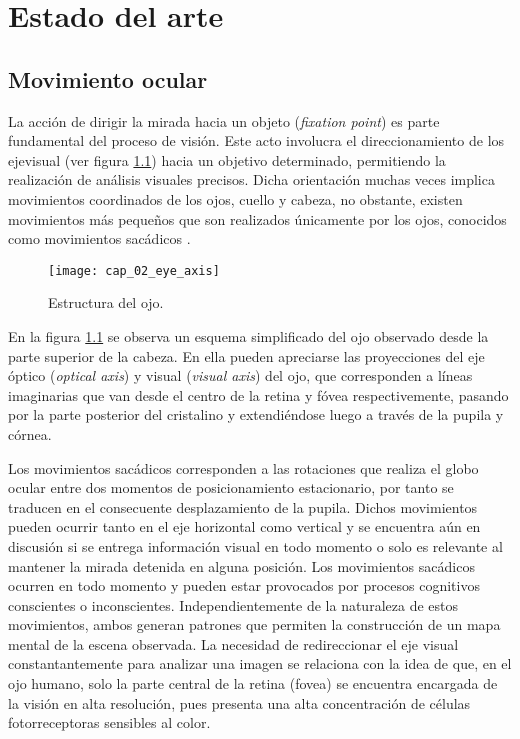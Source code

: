 \documentclass[../main.tex]{subfiles}
\begin{document}
		
\chapter{Estado del arte}
\label{cha:02_estado_del_arte}
	\section{Movimiento ocular}
	\label{sec:02_movimiento_ocular}
		La acción de dirigir la mirada hacia un objeto (\textit{fixation point}) es parte fundamental del proceso de visión. Este acto involucra el direccionamiento de los \gls{ejevisual} (ver figura \ref{fig:02_eye_axis}) hacia un objetivo determinado, permitiendo la realización de análisis visuales precisos. Dicha orientación muchas veces implica movimientos coordinados de los ojos, cuello y cabeza, no obstante, existen movimientos más pequeños que son realizados únicamente por los ojos, conocidos como movimientos sacádicos \cite{article:movOcular1, article:movOcular2}.
		\begin{figure}[H]
			\centering
			\texttt{[image: cap\_02\_eye\_axis]}
			\caption[Estructura del ojo]{Estructura del ojo\footnotemark.}
			\label{fig:02_eye_axis}
		\end{figure}

		En la figura \ref{fig:02_eye_axis} se observa un esquema simplificado del ojo observado desde la parte superior de la cabeza. En ella pueden apreciarse las proyecciones del eje óptico (\textit{optical axis}) y visual (\textit{visual axis}) del ojo, que corresponden a líneas imaginarias que van desde el centro de la retina y fóvea respectivemente, pasando por la parte posterior del cristalino y extendiéndose luego a través de la pupila y córnea.  

		Los movimientos sacádicos corresponden a las rotaciones que realiza el globo ocular entre dos momentos de posicionamiento estacionario, por tanto se traducen en el consecuente desplazamiento de la pupila. Dichos movimientos pueden ocurrir tanto en el eje horizontal como vertical y se encuentra aún en discusión \cite{article:movOcular2, article:movOcular3} si se entrega información visual en todo momento o solo es relevante al mantener la mirada detenida en alguna posición. Los movimientos sacádicos ocurren en todo momento y pueden estar provocados por procesos cognitivos conscientes o inconscientes. Independientemente de la naturaleza de estos movimientos, ambos generan patrones que permiten la construcción de un mapa mental de la escena observada. La necesidad de redireccionar el eje visual constantantemente para analizar una imagen se relaciona con la idea de que, en el ojo humano, solo la parte central de la retina (\gls{fovea}) se encuentra encargada de la visión en alta resolución, pues presenta una alta concentración de células fotorreceptoras sensibles al color. 
\end{document}
